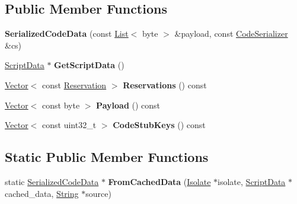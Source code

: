 \subsection*{Public Member Functions}
\begin{DoxyCompactItemize}
\item 
{\bfseries Serialized\+Code\+Data} (const \hyperlink{classv8_1_1internal_1_1_list}{List}$<$ byte $>$ \&payload, const \hyperlink{classv8_1_1internal_1_1_code_serializer}{Code\+Serializer} \&cs)\hypertarget{classv8_1_1internal_1_1_serialized_code_data_aba39a0832fa73f5feede46a947656845}{}\label{classv8_1_1internal_1_1_serialized_code_data_aba39a0832fa73f5feede46a947656845}

\item 
\hyperlink{classv8_1_1internal_1_1_script_data}{Script\+Data} $\ast$ {\bfseries Get\+Script\+Data} ()\hypertarget{classv8_1_1internal_1_1_serialized_code_data_ac3f0b4f3c07b6218574be530df3772e7}{}\label{classv8_1_1internal_1_1_serialized_code_data_ac3f0b4f3c07b6218574be530df3772e7}

\item 
\hyperlink{classv8_1_1internal_1_1_vector}{Vector}$<$ const \hyperlink{classv8_1_1internal_1_1_serialized_data_1_1_reservation}{Reservation} $>$ {\bfseries Reservations} () const \hypertarget{classv8_1_1internal_1_1_serialized_code_data_a12c5ab8015778c249a1c1011387137a7}{}\label{classv8_1_1internal_1_1_serialized_code_data_a12c5ab8015778c249a1c1011387137a7}

\item 
\hyperlink{classv8_1_1internal_1_1_vector}{Vector}$<$ const byte $>$ {\bfseries Payload} () const \hypertarget{classv8_1_1internal_1_1_serialized_code_data_ac2435f45b960d016b809001d895a7348}{}\label{classv8_1_1internal_1_1_serialized_code_data_ac2435f45b960d016b809001d895a7348}

\item 
\hyperlink{classv8_1_1internal_1_1_vector}{Vector}$<$ const uint32\+\_\+t $>$ {\bfseries Code\+Stub\+Keys} () const \hypertarget{classv8_1_1internal_1_1_serialized_code_data_a98c546218120a2eae72066182a31ad54}{}\label{classv8_1_1internal_1_1_serialized_code_data_a98c546218120a2eae72066182a31ad54}

\end{DoxyCompactItemize}
\subsection*{Static Public Member Functions}
\begin{DoxyCompactItemize}
\item 
static \hyperlink{classv8_1_1internal_1_1_serialized_code_data}{Serialized\+Code\+Data} $\ast$ {\bfseries From\+Cached\+Data} (\hyperlink{classv8_1_1internal_1_1_isolate}{Isolate} $\ast$isolate, \hyperlink{classv8_1_1internal_1_1_script_data}{Script\+Data} $\ast$cached\+\_\+data, \hyperlink{classv8_1_1internal_1_1_string}{String} $\ast$source)\hypertarget{classv8_1_1internal_1_1_serialized_code_data_a5aa335cc015dfb6f3b836bce0466f003}{}\label{classv8_1_1internal_1_1_serialized_code_data_a5aa335cc015dfb6f3b836bce0466f003}

\end{DoxyCompactItemize}
